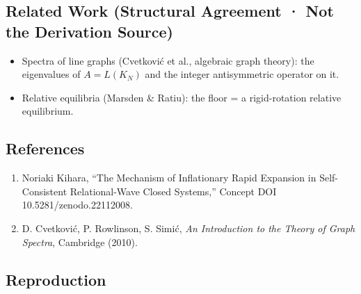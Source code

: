 \documentclass[
  a4paper,
]{ltjsarticle}
\providecommand{\tightlist}{%
  \setlength{\itemsep}{0pt}\setlength{\parskip}{0pt}}
\begin{document}
\subsection{Related Work (Structural Agreement · Not the Derivation
Source)}\label{related-work-structural-agreement-not-the-derivation-source}

\begin{itemize}
\tightlist
\item
  Spectra of line graphs (Cvetković et al., algebraic graph theory): the
  eigenvalues of \(A=L(K_N)\) and the integer antisymmetric operator on
  it.
\item
  Relative equilibria (Marsden \& Ratiu): the floor = a rigid-rotation
  relative equilibrium.
\end{itemize}

\subsection{References}\label{references}

\begin{enumerate}
\def\labelenumi{\arabic{enumi}.}
\tightlist
\item
  Noriaki Kihara, ``The Mechanism of Inflationary Rapid Expansion in
  Self-Consistent Relational-Wave Closed Systems,'' Concept DOI
  10.5281/zenodo.22112008.
\item
  D. Cvetković, P. Rowlinson, S. Simić, \emph{An Introduction to the
  Theory of Graph Spectra}, Cambridge (2010).
\end{enumerate}

\subsection{Reproduction}\label{reproduction}
\end{document}
